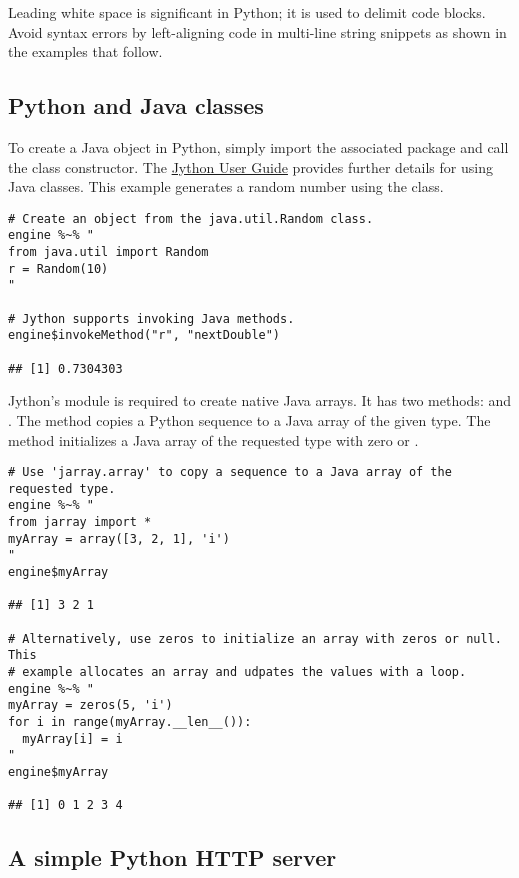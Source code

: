  Leading white space is significant in Python; it is used to delimit code blocks. Avoid syntax errors by left-aligning code in multi-line string snippets as shown in the examples that follow.

\subsection{Python and Java classes}

To create a Java object in Python, simply import the associated package and call the class constructor. The \href{https://wiki.python.org/jython/NewUsersGuide}{Jython User Guide} provides further details for using Java classes. This example generates a random number using the  class.

\begin{verbatim}
# Create an object from the java.util.Random class.
engine %~% "
from java.util import Random
r = Random(10)
"

# Jython supports invoking Java methods.
engine$invokeMethod("r", "nextDouble")

## [1] 0.7304303
\end{verbatim}

Jython's  module is required to create native Java arrays. It has two methods:  and . The  method copies a Python sequence to a Java array of the given type. The  method initializes a Java array of the requested type with zero or .

\begin{verbatim}
# Use 'jarray.array' to copy a sequence to a Java array of the requested type.
engine %~% "
from jarray import *
myArray = array([3, 2, 1], 'i')
"
engine$myArray

## [1] 3 2 1

# Alternatively, use zeros to initialize an array with zeros or null. This
# example allocates an array and udpates the values with a loop.
engine %~% "
myArray = zeros(5, 'i')
for i in range(myArray.__len__()):
  myArray[i] = i
"
engine$myArray

## [1] 0 1 2 3 4
\end{verbatim}

\subsection{A simple Python HTTP server}

